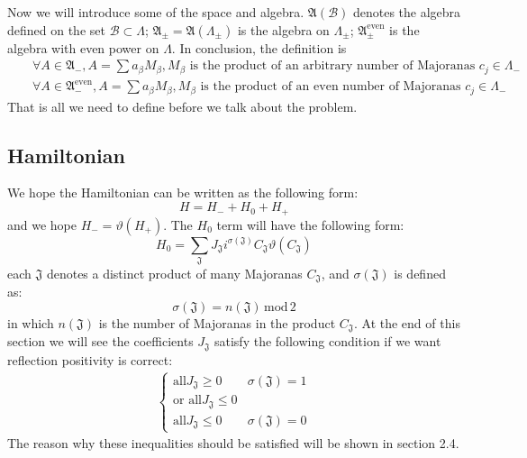 \documentclass{article}
\begin{document}
Now we will introduce some of the space and algebra. $\mathfrak{A}(\mathcal{B})$ denotes the algebra defined on the set $\mathcal{B}\subset \Lambda$; $\mathfrak{A}_\pm = \mathfrak{A}(\Lambda_\pm)$ is the algebra on $\Lambda_\pm$; $\mathfrak{A}^\mathrm{even}_\pm$ is the algebra with even power on $\Lambda$. In conclusion, the definition is
\begin{eqnarray*}
&&\forall A \in \mathfrak{A}_-, A = \sum a_\beta M_\beta, M_\beta \textrm{ is the product of an arbitrary number of Majoranas }c_j \in \Lambda_- \\
&&\forall A \in \mathfrak{A}^{\mathrm{even}}_-, A = \sum a_\beta M_\beta, M_\beta \textrm{ is the product of an even number of Majoranas }c_j \in \Lambda_- 
\end{eqnarray*}
That is all we need to define before we talk about the problem.

\subsection{Hamiltonian}
We hope the Hamiltonian can be written as the following form:
\begin{equation}
H = H_- + H_0 + H_+
\end{equation}
and we hope $H_- = \vartheta(H_+)$. The $H_0$ term will have the following form:
\begin{equation}
H_0 = \sum_{\mathfrak{J}}J_{\mathfrak{J}}i^{\sigma(\mathfrak{J})}C_{\mathfrak{J}}\vartheta(C_{\mathfrak{J}})
\end{equation}
each $\mathfrak{J}$ denotes a distinct product of many Majoranas $C_{\mathfrak{J}}$, and $\sigma(\mathfrak{J})$ is defined as:
$$
\sigma(  \mathfrak{J} ) = n(\mathfrak{J})\,\mathrm{mod}\,2
$$
in which $n(\mathfrak{J})$ is the number of Majoranas in the product $C_\mathfrak{J}$. At the end of this section we will see the coefficients $J_\mathfrak{J}$ satisfy the following condition if we want reflection positivity is correct:
\begin{eqnarray*}
\left\{\begin{array}{ll}
\textrm{all} J_\mathfrak{J} \geq 0 & \sigma(\mathfrak{J}) = 1\\
\textrm{or all} J_\mathfrak{J} \leq 0 &\\
\textrm{all} J_\mathfrak{J} \leq 0 & \sigma(\mathfrak{J}) = 0
\end{array}\right.
\end{eqnarray*}
The reason why these inequalities should be satisfied will be shown in section 2.4.
\end{document}
